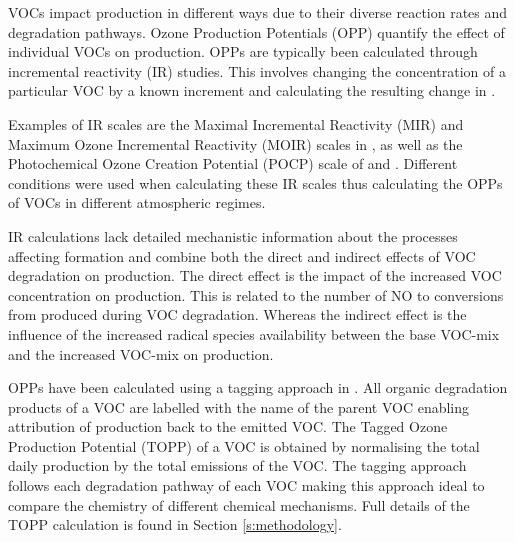 VOCs impact  production in different ways due to their diverse reaction rates and degradation pathways. 
Ozone Production Potentials (OPP) quantify the effect of individual VOCs on  production. 
OPPs are typically been calculated through incremental reactivity (IR) studies. 
This involves changing the concentration of a particular VOC by a known increment and calculating the resulting change in . 

Examples of IR scales are the Maximal Incremental Reactivity (MIR) and Maximum Ozone Incremental Reactivity (MOIR) scales in \citet{Carter:1994}, as well as the Photochemical Ozone Creation Potential (POCP) scale of \citet{Derwent:1996} and \citet{Derwent:1998}. 
Different  conditions were used when calculating these IR scales thus calculating the OPPs of VOCs in different atmospheric regimes.



IR calculations lack detailed mechanistic information about the processes affecting  formation and combine both the direct and indirect effects of VOC degradation on  production. 
The direct effect is the impact of the increased VOC concentration on  production. 
This is related to the number of NO to  conversions from  produced during VOC degradation. 
Whereas the indirect effect is the influence of the increased radical species availability between the base VOC-mix and the increased VOC-mix on  production.

OPPs have been calculated using a tagging approach in \citet{Butler:2011}. 
All organic degradation products of a VOC are labelled with the name of the parent VOC enabling attribution of  production back to the emitted VOC. 
The Tagged Ozone Production Potential (TOPP) of a VOC is obtained by normalising the total daily  production by the total emissions of the VOC. 
The tagging approach follows each degradation pathway of each VOC making this approach ideal to compare the chemistry of different chemical mechanisms. 
Full details of the TOPP calculation is found in Section \ref{s:methodology}.

